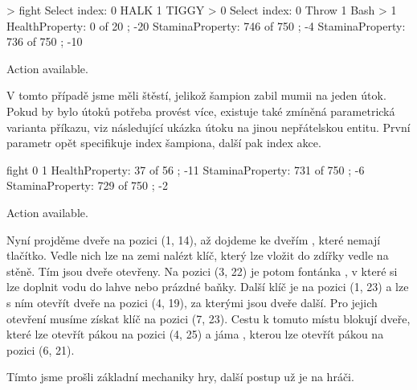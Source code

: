 \begin{code}
> fight 
Select index:
0 HALK
1 TIGGY
> 0
Select index:
0 Throw
1 Bash
> 1
HealthProperty: 0 of 20 ; -20
StaminaProperty: 746 of 750 ; -4
StaminaProperty: 736 of 750 ; -10

Action available.
\end{code}

V tomto případě jsme měli štěstí, jelikož šampion zabil mumii na jeden útok.
Pokud by bylo útoků potřeba provést více, existuje také zmíněná parametrická varianta příkazu, viz následující
ukázka útoku na jinou nepřátelskou entitu. První parametr opět specifikuje index šampiona, další pak index akce.

\begin{code}
fight 0 1
HealthProperty: 37 of 56 ; -11
StaminaProperty: 731 of 750 ; -6
StaminaProperty: 729 of 750 ; -2

Action available.
\end{code}

Nyní projděme dveře na pozici (1, 14), až dojdeme ke dveřím , které nemají tlačítko. 
Vedle nich lze na zemi nalézt klíč, který lze vložit do zdířky vedle na stěně. Tím
jsou dveře otevřeny. Na pozici (3,  22) je potom fontánka , v které si lze doplnit vodu do lahve nebo prázdné baňky.
 Další klíč je na pozici (1, 23) a lze s ním otevřít dveře na pozici
(4, 19), za kterými jsou dveře další. Pro jejich otevření musíme získat klíč na pozici (7, 23).
Cestu k tomuto místu blokují dveře, které lze otevřít pákou na pozici (4, 25) a jáma , kterou lze otevřít
pákou na pozici (6, 21). 


Tímto jsme prošli základní mechaniky hry, další postup už je na hráči.

